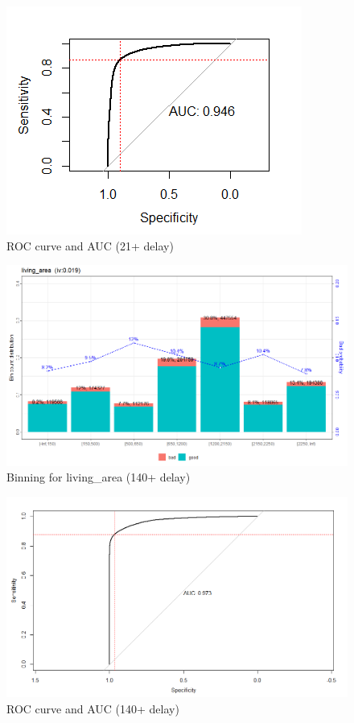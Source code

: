 \documentclass[
]{article}
\begin{document}
\begin{figure}
\centering
\includegraphics{.//AUC21.png}
\caption{\label{fig:auc21} ROC curve and AUC (21+ delay)}
\end{figure}

\begin{figure}
\centering
\includegraphics{.//WOE140.png}
\caption{\label{fig:woe140} Binning for living\_area (140+ delay)}
\end{figure}

\begin{figure}
\centering
\includegraphics{.//AUC140.png}
\caption{\label{fig:auc140} ROC curve and AUC (140+ delay)}
\end{figure}
\end{document}
